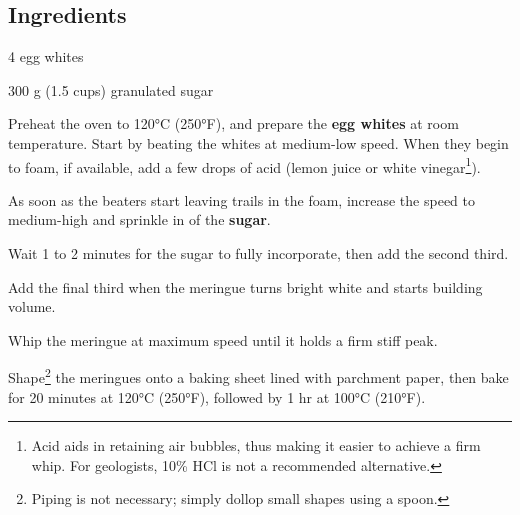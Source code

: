 \newpage
{}

\subsection*{Ingredients}
\begin{ingredients}
	\item 4 egg whites
	\item 300 g (1.5 cups) granulated sugar
\end{ingredients}

\medskip

Preheat the oven to 120°C (250°F), and prepare the \textbf{egg whites} at room temperature. 
Start by beating the whites at medium-low speed. 
When they begin to foam, if available, add a few drops of acid (lemon juice or white vinegar\footnote{Acid aids in retaining air bubbles, thus making it easier to achieve a firm whip. For geologists, 10\% HCl is not a recommended alternative.}).

As soon as the beaters start leaving trails in the foam, increase the speed to medium-high and sprinkle in  of the \textbf{sugar}.

Wait 1 to 2 minutes for the sugar to fully incorporate, then add the second third.

Add the final third when the meringue turns bright white and starts building volume.

Whip the meringue at maximum speed until it holds a firm stiff peak.

Shape\footnote{Piping is not necessary; simply dollop small shapes using a spoon.} the meringues onto a baking sheet lined with parchment paper, then bake for 20 minutes at 120°C (250°F), followed by 1 hr at 100°C (210°F). 


\vspace*{0.75 cm}

\begin{recipeblock}
	\noindent 
\end{recipeblock}
